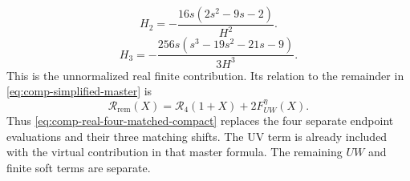 \begin{equation}
H_2=- \frac{16 s \left(2 s^{2} - 9 s - 2\right)}{H^{2}}.
\end{equation}
\begin{equation}
H_3=- \frac{256 s \left(s^{3} - 19 s^{2} - 21 s - 9\right)}{3 H^{3}}.
\end{equation}
This is the unnormalized real finite contribution. Its relation to the remainder in \eqref{eq:comp-simplified-master} is
\begin{equation}
 \mathcal R_{\mathrm{rem}}(X)=\mathcal R_4(1+X)+2F_{UW}^{\eta}(X).
\end{equation}
Thus \eqref{eq:comp-real-four-matched-compact} replaces the four separate endpoint evaluations and their three matching shifts. The UV term is already included with the virtual contribution in that master formula. The remaining $UW$ and finite soft terms are separate.

